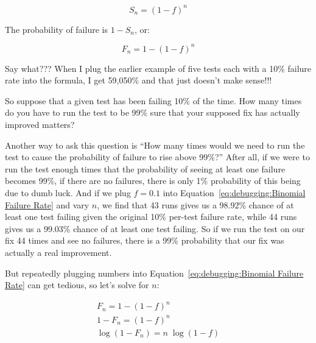 \begin{equation}
	S_n = \left(1-f\right)^n
\end{equation}

The probability of failure is $1-S_n$, or:

\begin{equation}
	F_n = 1-\left(1-f\right)^n
\label{eq:debugging:Binomial Failure Rate}
\end{equation}

\QuickQuiz{}
	Say what???
	When I plug the earlier example of five tests each with a
	10\% failure rate into the formula, I get 59,050\% and that
	just doesn't make sense!!!
 \QuickQuizEnd

So suppose that a given test has been failing 10\% of the time.
How many times do you have to run the test to be 99\% sure that
your supposed fix has actually improved matters?

Another way to ask this question is ``How many times would we need
to run the test to cause the probability of failure to rise above 99\%?''
After all, if we were to run the test enough times that the probability
of seeing at least one failure becomes 99\%, if there are no failures,
there is only 1\% probability of this being due to dumb luck.
And if we plug $f=0.1$ into
Equation~\ref{eq:debugging:Binomial Failure Rate} and vary $n$,
we find that 43 runs gives us a 98.92\% chance of at least one test failing
given the original 10\% per-test failure rate,
while 44 runs gives us a 99.03\% chance of at least one test failing.
So if we run the test on our fix 44 times and see no failures, there
is a 99\% probability that our fix was actually a real improvement.

But repeatedly plugging numbers into
Equation~\ref{eq:debugging:Binomial Failure Rate}
can get tedious, so let's solve for $n$:

\begin{eqnarray}
	F_n = 1-\left(1-f\right)^n \\
	1 - F_n = \left(1-f\right)^n \\
	\log \left(1 - F_n\right) = n \; \log \left(1 - f\right)
\end{eqnarray}

